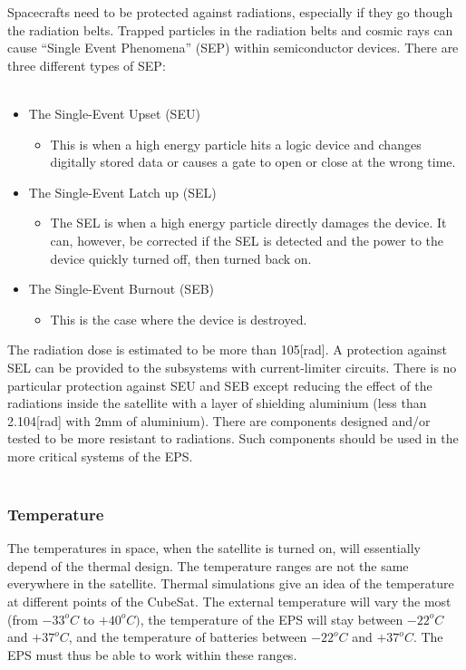 Spacecrafts need to be protected against radiations, especially if they go though the radiation belts. Trapped particles in the radiation belts and cosmic rays can cause “Single Event Phenomena” (SEP) within semiconductor devices. There are three different types of SEP:
\\ \\
\begin{itemize}
\item The Single-Event Upset (SEU)
\begin{itemize}
\item This is when a high energy particle hits a logic device and changes digitally stored data or causes a gate to open or close at the wrong time.
\end{itemize}
\item The Single-Event Latch up (SEL)
\begin{itemize}
\item The SEL is when a high energy particle directly damages the device. It can, however, be corrected if the SEL is detected and the power to the device quickly turned off, then turned back on.
\end{itemize}
\item The Single-Event Burnout (SEB)
\begin{itemize}
\item This is the case where the device is destroyed.
\end{itemize}

\end{itemize}


The radiation dose is estimated to be more than 105[rad]. A protection against SEL can be provided to the subsystems with current-limiter circuits. There is no particular protection against SEU and SEB except reducing the effect of the radiations inside the satellite with a layer of shielding aluminium (less than 2.104[rad] with 2mm of aluminium). There are components designed and/or tested to be more resistant to radiations. Such components should be used in the more critical systems of the EPS.
\\ \\
\subsubsection{Temperature}

The temperatures in space, when the satellite is turned on, will essentially depend of the thermal design. The temperature ranges are not the same everywhere in the satellite. Thermal simulations give an idea of the temperature at different points of the CubeSat. The external temperature will vary the most (from $-33^{o}C$ to $+40^{o}C)$, the temperature of the EPS will stay between $-22^{o}C$ and $+37^{o}C$, and the temperature of batteries between $-22^{o}C$ and $+37^{o}C$. The EPS must thus be able to work within these ranges.

